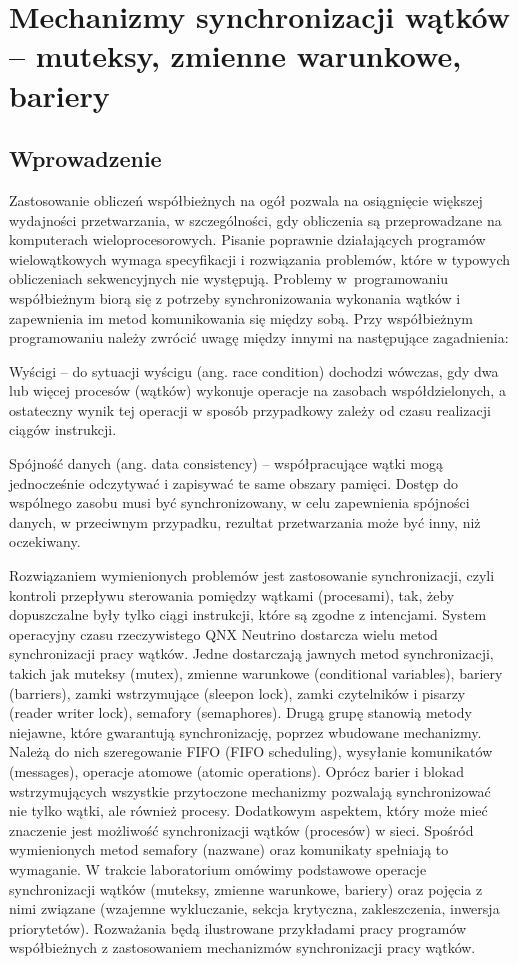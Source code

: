\section{Mechanizmy synchronizacji wątków – muteksy, zmienne warunkowe, bariery}

\subsection{Wprowadzenie}
Zastosowanie obliczeń współbieżnych na ogół pozwala na osiągnięcie większej wydajności przetwarzania, w szczególności, gdy obliczenia są przeprowadzane na komputerach wieloprocesorowych. Pisanie poprawnie działających programów wielowątkowych wymaga specyfikacji i rozwiązania problemów, które w typowych obliczeniach sekwencyjnych nie występują. Problemy w~programowaniu współbieżnym biorą się z potrzeby synchronizowania wykonania wątków i zapewnienia im metod komunikowania się między sobą. Przy współbieżnym programowaniu należy zwrócić uwagę między innymi na następujące zagadnienia:

\begin{myitemize}
\item Wyścigi -- do sytuacji wyścigu (ang. race condition) dochodzi wówczas, gdy dwa lub więcej procesów (wątków) wykonuje operacje na zasobach współdzielonych, a ostateczny wynik tej operacji w sposób przypadkowy zależy od czasu realizacji ciągów instrukcji.
\item Spójność danych (ang. data consistency) -- współpracujące wątki mogą jednocześnie odczytywać i zapisywać te same obszary pamięci. Dostęp do wspólnego zasobu musi być synchronizowany, w celu zapewnienia spójności danych, w przeciwnym przypadku, rezultat przetwarzania może być inny, niż oczekiwany.
\end{myitemize}

Rozwiązaniem wymienionych problemów jest zastosowanie synchronizacji, czyli kontroli przepływu sterowania pomiędzy wątkami (procesami), tak, żeby dopuszczalne były tylko ciągi instrukcji, które są zgodne z intencjami. System operacyjny czasu rzeczywistego QNX Neutrino dostarcza wielu metod synchronizacji pracy wątków. Jedne dostarczają jawnych metod synchronizacji, takich jak muteksy (mutex), zmienne warunkowe (conditional variables), bariery (barriers), zamki wstrzymujące (sleepon lock), zamki czytelników i pisarzy (reader writer lock), semafory (semaphores). Drugą grupę stanowią metody niejawne, które gwarantują synchronizację, poprzez wbudowane mechanizmy. Należą do nich szeregowanie FIFO (FIFO scheduling), wysyłanie komunikatów (messages), operacje atomowe (atomic operations). Oprócz barier i blokad wstrzymujących wszystkie przytoczone mechanizmy pozwalają synchronizować nie tylko wątki, ale również procesy. Dodatkowym aspektem, który może mieć znaczenie jest możliwość synchronizacji wątków (procesów) w sieci. Spośród wymienionych metod semafory (nazwane) oraz komunikaty spełniają to wymaganie.
W trakcie laboratorium omówimy podstawowe operacje synchronizacji wątków (muteksy, zmienne warunkowe, bariery) oraz pojęcia z nimi związane (wzajemne wykluczanie, sekcja krytyczna, zakleszczenia, inwersja priorytetów). Rozważania będą ilustrowane przykładami pracy programów współbieżnych z zastosowaniem mechanizmów synchronizacji pracy wątków.

